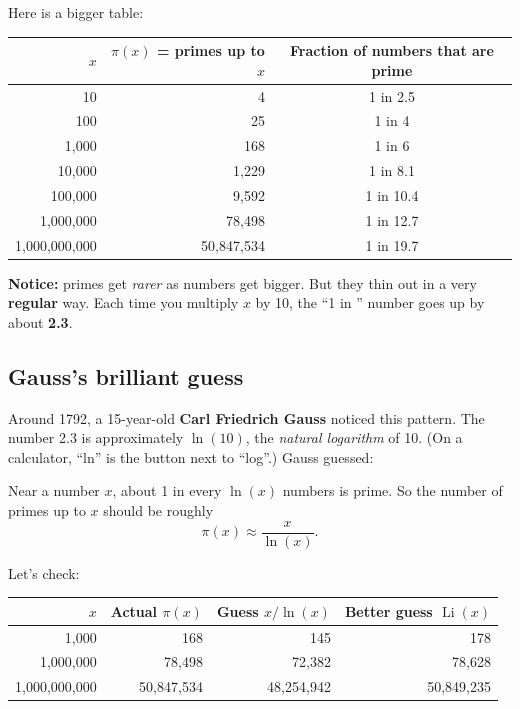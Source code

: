 \documentclass[11pt,a4paper]{article}
\newcommand{\Li}{\operatorname{Li}}
\begin{document}
Here is a bigger table:

\begin{center}
\begin{tabular}{r r c}
\toprule
$x$ & $\pi(x)$ = primes up to $x$ & Fraction of numbers that are prime \\
\midrule
10 & 4 & 1 in 2.5 \\
100 & 25 & 1 in 4 \\
1{,}000 & 168 & 1 in 6 \\
10{,}000 & 1{,}229 & 1 in 8.1 \\
100{,}000 & 9{,}592 & 1 in 10.4 \\
1{,}000{,}000 & 78{,}498 & 1 in 12.7 \\
1{,}000{,}000{,}000 & 50{,}847{,}534 & 1 in 19.7 \\
\bottomrule
\end{tabular}
\end{center}

\textbf{Notice:} primes get \emph{rarer} as numbers get bigger. But they thin out in a very \textbf{regular} way. Each time you multiply $x$ by 10, the ``1 in \underline{\hspace{1em}}'' number goes up by about \textbf{2.3}.

\subsection*{Gauss's brilliant guess}

Around 1792, a 15-year-old \textbf{Carl Friedrich Gauss} noticed this pattern. The number 2.3 is approximately $\ln(10)$, the \emph{natural logarithm} of 10. (On a calculator, ``ln'' is the button next to ``log''.) Gauss guessed:

\begin{keybox}
Near a number $x$, about 1 in every $\ln(x)$ numbers is prime. So the number of primes up to $x$ should be roughly
\[
\pi(x) \approx \frac{x}{\ln(x)}.
\]
\end{keybox}

Let's check:

\begin{center}
\begin{tabular}{r r r r}
\toprule
$x$ & Actual $\pi(x)$ & Guess $x/\ln(x)$ & Better guess $\Li(x)$ \\
\midrule
1{,}000 & 168 & 145 & 178 \\
1{,}000{,}000 & 78{,}498 & 72{,}382 & 78{,}628 \\
1{,}000{,}000{,}000 & 50{,}847{,}534 & 48{,}254{,}942 & 50{,}849{,}235 \\
\bottomrule
\end{tabular}
\end{center}
\end{document}
